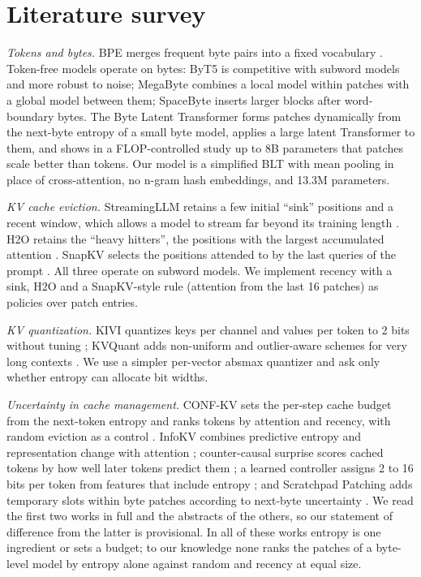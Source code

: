 \documentclass[10pt,twocolumn]{extarticle}
\begin{document}
\section{Literature survey}\label{sec:related}
\textit{Tokens and bytes.} BPE merges frequent byte pairs into a fixed vocabulary \citep{sennrich2016bpe}. Token-free models operate on bytes: ByT5 \citep{xue2022byt5} is competitive with subword models and more robust to noise; MegaByte \citep{yu2023megabyte} combines a local model within patches with a global model between them; SpaceByte \citep{slagle2024spacebyte} inserts larger blocks after word-boundary bytes. The Byte Latent Transformer \citep{pagnoni2024blt} forms patches dynamically from the next-byte entropy of a small byte model, applies a large latent Transformer to them, and shows in a FLOP-controlled study up to 8B parameters that patches scale better than tokens. Our model is a simplified BLT with mean pooling in place of cross-attention, no n-gram hash embeddings, and 13.3M parameters.

\textit{KV cache eviction.} StreamingLLM retains a few initial ``sink'' positions and a recent window, which allows a model to stream far beyond its training length \citep{xiao2024streaming}. H2O retains the ``heavy hitters'', the positions with the largest accumulated attention \citep{zhang2023h2o}. SnapKV selects the positions attended to by the last queries of the prompt \citep{li2024snapkv}. All three operate on subword models. We implement recency with a sink, H2O and a SnapKV-style rule (attention from the last 16 patches) as policies over patch entries.

\textit{KV quantization.} KIVI quantizes keys per channel and values per token to 2 bits without tuning \citep{liu2024kivi}; KVQuant adds non-uniform and outlier-aware schemes for very long contexts \citep{hooper2024kvquant}. We use a simpler per-vector absmax quantizer and ask only whether entropy can allocate bit widths.

\textit{Uncertainty in cache management.} CONF-KV sets the per-step cache budget from the next-token entropy and ranks tokens by attention and recency, with random eviction as a control \citep{li2026confkv}. InfoKV combines predictive entropy and representation change with attention \citep{kai2026infokv}; counter-causal surprise scores cached tokens by how well later tokens predict them \citep{gould2026counter}; a learned controller assigns 2 to 16 bits per token from features that include entropy \citep{boroujeni2026bits}; and Scratchpad Patching adds temporary slots within byte patches according to next-byte uncertainty \citep{zheng2026scratchpad}. We read the first two works in full and the abstracts of the others, so our statement of difference from the latter is provisional. In all of these works entropy is one ingredient or sets a budget; to our knowledge none ranks the patches of a byte-level model by entropy alone against random and recency at equal size.
\end{document}

